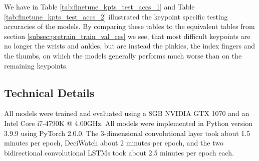 \documentclass[./main.tex]{subfiles}
\begin{document}
\noindent We have in Table \ref{tab:finetune_kpts_test_accs_1} and Table \ref{tab:finetune_kpts_test_accs_2} illustrated the keypoint specific testing accuracies of the models. By comparing these tables to the equivalent tables from section \ref{subsec:pretrain_train_val_res} we see, that most difficult keypoints are no longer the wrists and ankles, but are instead the pinkies, the index fingers and the thumbs, on which the models generally performs much worse than on the remaining keypoints.

\subsection{Technical Details}
All models were trained and evaluated using a 8GB NVIDIA GTX 1070 and an Intel Core i7-4790K @ 4.00GHz. All models were implemented in Python version 3.9.9 using PyTorch 2.0.0. The 3-dimensional convolutional layer took about 1.5 minutes per epoch, DeciWatch about 2 minutes per epoch, and the two bidirectional convolutional LSTMs took about 2.5 minutes per epoch each.
\end{document}
